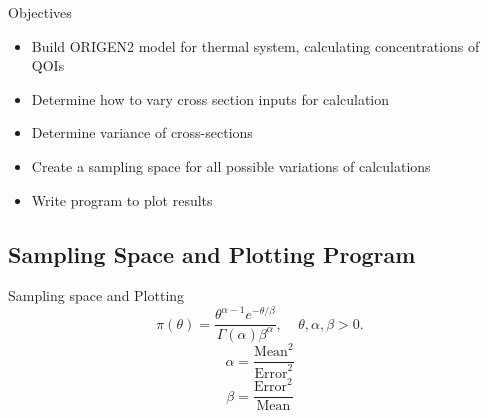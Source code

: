 \documentclass{beamer}
\newcommand{\cmark}{\ding{51}}%
\newcommand{\xmark}{\ding{55}}%
\newcommand{\done}{\rlap{$\square$}{\raisebox{2pt}{\large\hspace{1pt}\cmark}}%
  \hspace{-2.5pt}}
\newcommand{\wontfix}{\rlap{$\square$}{\large\hspace{1pt}\xmark}}
\newcommand{\ndone}{\rlap{$\square$}{\raisebox{2pt}{}}%
  \hspace{8pt}}
\begin{document}
\begin{frame}
  \begin{block}{Objectives}
  \vspace{0.3cm}
  \begin{itemize}
  \item[\done]{Build ORIGEN2 model for thermal system, calculating
  concentrations of QOIs}
  \item[\wontfix]{Determine how to vary cross section inputs for calculation}
  \item[\done]{Determine variance of cross-sections}
  \item[\ndone]{Create a sampling space for all possible variations of
    calculations}
  \item[\ndone]{Write program to plot results}
  \end{itemize}
  \vspace{0.3cm}
\end{block}
\end{frame}


\subsection{Sampling Space and Plotting Program}
\begin{frame}{Sampling space and Plotting}
  \begin{equation*}
    \pi(\theta)=\frac{\theta^{\alpha-1}e^{-\theta/\beta}}{\Gamma(\alpha)
      \beta^{\alpha}},\ \ \ \ \ \theta,\alpha,\beta>0.
  \end{equation*}
  \vspace{1cm}
  \begin{equation*}
    \alpha=\frac{\text{Mean}^2}{\text{Error}^2}
  \end{equation*}
  \begin{equation*}
    \beta=\frac{\text{Error}^2}{\text{Mean}}
  \end{equation*}
\end{frame}
\end{document}
